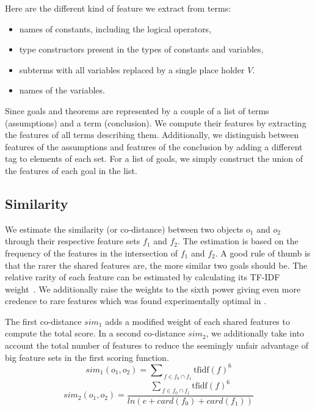 \documentclass[runningheads,a4paper,draft]{svjour3}
\begin{document}
Here are the different kind of feature we extract from terms:
\begin{itemize}
\item names of constants, including the logical operators,
\item type constructors present in the types of constants and variables,
\item subterms with all variables replaced by a single place holder $V$.
\item names of the variables.
\end{itemize}

Since goals and theorems are represented by a couple of a list of terms 
(assumptions) and a term (conclusion). We compute their features by extracting 
the features of all terms describing them. Additionally, we distinguish between 
features of the assumptions and features of the conclusion by adding a 
different tag to elements of each set. For a list of goals, we simply construct 
the union of the features of each goal 
in the list. 

\subsection{Similarity}\label{sec:predictions}
We estimate the similarity (or co-distance) between two objects $o_1$ and $o_2$ 
through their respective feature sets $f_1$ and $f_2$.
The estimation is based on the frequency of the features in the intersection of 
$f_1$ and $f_2$. A good rule of thumb is that the rarer the shared features 
are, the more similar two goals should be. The relative rarity of each feature 
can be estimated by calculating its TF-IDF weight~\cite{Jones72astatistical}.
We additionally raise the weights to the sixth power giving even more credence 
to rare features which was found experimentally optimal in \cite{}.

The first co-distance $sim_1$ adds a modified weight of each shared 
features to compute the total score.
In a second co-distance $sim_2$, we additionally take into account 
the total number of features to reduce the seemingly unfair advantage of big 
feature sets in the first scoring function.
\[sim_1 (o_1, o_2) = {\sum\nolimits_{\,f \in f_0 \cap 
f_1}{\text{tfidf}(f)^{6}}}\]
\[sim_2 (o_1, o_2) = \frac{{\sum\nolimits_{\,f \in f_0 \cap 
f_1}{\text{tfidf}(f)^{6}}}}
{ln (e + card(f_0) + card(f_1))}\]
\end{document}
